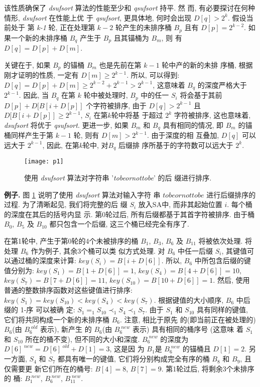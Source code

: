 \documentclass{ws-ijprai}
\begin{document}
该性质确保了 \emph{dsufsort} 算法的性能至少和 \emph{qsufsort} 持平. 然
而, 有必要探讨在何种情形, \emph{dsufsort} 在性能上优
于 \emph{qsufsort}, 更具体地, 何时会出现 $D[q] > 2^k$. 假设当前处于
第 \emph{k-1} 轮, 正在处理第 $k-2$ 轮产生的未排序桶 $B_p$ 且有 $D[p] =
2^{k-2}$. 如果一个新的未排序桶 $B_q$ 产生于 $B_p$ 且其锚桶为 $B_m$, 则
有 $D[q] = D[p] + D[m]$.

关键在于, 如果 $B_p$ 的锚桶 $B_m$ 也是先前在第 $k-1$ 轮中产的新的未排
序桶, 根据刚才证明的性质, 一定有 $D[m] \geq 2^{k-1}$. 所以, 可以得到:
$D[q] = D[p] + D[m] \geq 2^{k-2} + 2^{k-1} > 2^{k-1}$, 这意味着 $B_q$
的深度严格大于 $2^{k-1}$. 因此, 当 $B_q$ 在第 $k$ 轮中被处理时, $B_p$
中的任一 $S_i$ 将会基于其前 $D[p] + D[B[i+D[p]]$ 个字符被排序, 由于
$D[q] > 2^{k-1}$ 且 $D[B[i+D[p]] \geq 2^{k-1}$, $S_i$ 在第$k$轮中将基
于超过 $2^k$ 字符被排序, 这也意味着, \emph{dsufsort} 将优于
\emph{qsufsort}. 更进一步, 如果 $B_m$ 和 $B_q$ 具有相同的情况, 即
$B_m$ 的锚桶同样产生于第 $k-1$ 轮, 则有 $D[m] > 2^{k-1}$. 由于深度的相
互叠加, $D[q]$ 可以远大于 $2^{k-1}$, 因此, 在第$k$轮中, 对$B_q$ 后缀排
序所基于的字符数可以远大于 $2^k$.

\begin{figure}[bh]
\centerline{\texttt{[image: p1]}}
\vspace*{8pt}
\caption{使用 \emph{dsufsort} 算法对字符串 '\emph{tobeornottobe}' 的后
  缀进行排序.}
\label{fig:1}
\end{figure}

\textbf{例子.} 图 \ref{fig:1} 说明了使用 \emph{dsufsort} 算法对输入字符
串 $tobeornottobe$ 进行后缀排序的过程. 为了清晰起见, 我们将完整的后
缀 $S_i$ 放入SA中, 而非其起始位置 $i$. 每个桶的深度在其后的括号内显
示. 第0轮过后, 所有后缀都基于其首字符被排序. 由于桶 $B_0$,
$B_5$ 及 $B_{10}$ 都只包含一个后缀, 这三个桶已经完全有序了.

在第1轮中, 产生于第0轮的4个未被排序的桶 $B_1$, $B_3$,
$B_6$ 及 $B_{11}$ 将被依次处理. 将处理 $B_6$ 作为例子, 其余3个桶可以类
似方式处理. 对 $B_6$ 中任一后缀 $S_i$, 其键值可以通过桶的深度来计算:
$key(S_i) = B[i+D[6]]$. 所以, $B_6$ 中所包含后缀的键值分别为:
$key(S_1) = B[1+D[6]] = 1$, $key(S_4) = B[4+D[6]] = 10$,
$key(S_7) = B[7+D[6]] = 11$, $key(S_{10}) = B[10+D[6]] = 1$. 然后, 使用
普通的整数排序函数对这些键值进行排序: $key(S_1) = key(S_{10}) <
key(S_4) < key(S_7)$.  根据键值的大小顺序, $B_6$ 中后缀的 1-序 可以被确
定: $S_1 =_ 1 S_{10} \prec_1 S_4 \prec_1 S_7$. 由于 $S_1$ 和 $S_{10}$
具有同样的键值, 它们将共同构成一个新的未排序桶 $B_6$. 注意, 相比于原先
的(即当前正在被处理的) $B_6$(由 $B_6^{\;old}$ 表示), 新产生
的 $B_6$(由 $B_6^{\;new}$ 表示) 具有相同的桶序号 (这意味
着 $S_1$ 和 $S_{10}$ 所在的桶不变), 但不同的大小和深度. $B_6^{\;new}$
的深度为 $D[6]^{\;new} = D[6]^{\;old} + D[1] = 3$, 这是因
为 $B_1$是 $B_6^{\;new}$ 的锚桶且 $D[1] = 2$. 另一方面, $S_4$ 和 $S_7$
都具有唯一的键值, 它们将分别构成完全有序的桶 $B_8$ 和 $B_9$, 且仅需要更
新它们所在的桶号: $B[4] = 8$, $B[7] = 9$. 第1轮过后, 将剩余3个未排序的
桶: $B_1^{\;new}$, $B_6^{\;new}$, $B_{11}^{\;new}$.
\end{document}
